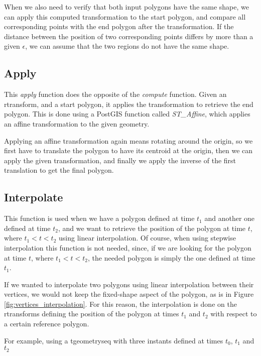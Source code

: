 When we also need to verify that both input polygons have the same shape, we can apply this computed transformation to the start polygon, and compare all corresponding points with the end polygon after the transformation. If the distance between the position of two corresponding points differs by more than a given $\epsilon$, we can assume that the two regions do not have the same shape.

\subsection{Apply}
\label{section:apply}

This \textit{apply} function does the opposite of the \textit{compute} function. Given an rtransform, and a start polygon, it applies the transformation to retrieve the end polygon. This is done using a PostGIS function called \textit{ST\_Affine}, which applies an affine transformation to the given geometry. 

Applying an affine transformation again means rotating around the origin, so we first have to translate the polygon to have its centroid at the origin, then we can apply the given transformation, and finally we apply the inverse of the first translation to get the final polygon.


\subsection{Interpolate}
\label{section:interpolate}

This function is used when we have a polygon defined at time $t_1$ and another one defined at time $t_2$, and we want to retrieve the position of the polygon at time $t$, where $t_1 < t < t_2$ using linear interpolation. Of course, when using stepwise interpolation this function is not needed, since, if we are looking for the polygon at time $t$, where $t_1 < t < t_2$, the needed polygon is simply the one defined at time $t_1$.

If we wanted to interpolate two polygons using linear interpolation between their vertices, we would not keep the fixed-shape aspect of the polygon, as is in Figure \ref{fig:vertices_interpolation}. For this reason, the interpolation is done on the rtransforms defining the position of the polygon at times $t_1$ and $t_2$ with respect to a certain reference polygon.

For example, using a tgeometryseq with three instants defined at times $t_0$, $t_1$ and $t_2$

